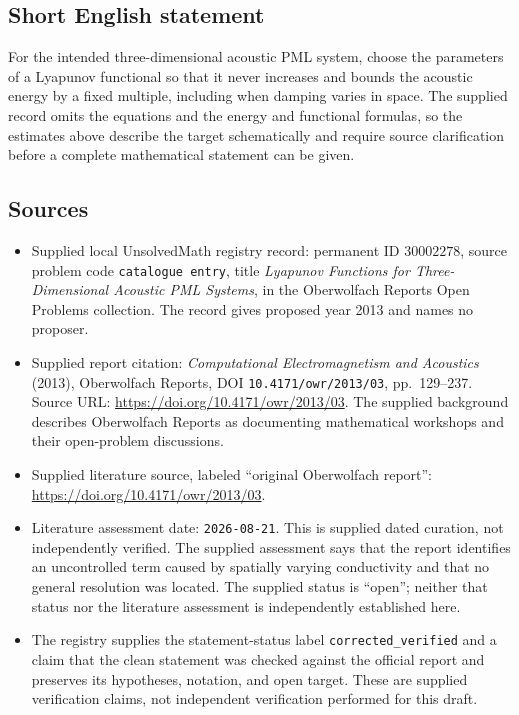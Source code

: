 \documentclass[11pt]{article}
\begin{document}
\subsection{Short English statement}
For the intended three-dimensional acoustic PML system, choose the parameters of a Lyapunov functional so that it never increases and bounds the acoustic energy by a fixed multiple, including when damping varies in space. The supplied record omits the equations and the energy and functional formulas, so the estimates above describe the target schematically and require source clarification before a complete mathematical statement can be given.
\subsection{Sources}
\begin{itemize}
\item Supplied local UnsolvedMath registry record: permanent ID \(30002278\), source problem code \texttt{catalogue entry}, title \emph{Lyapunov Functions for Three-Dimensional Acoustic PML Systems}, in the Oberwolfach Reports Open Problems collection. The record gives proposed year 2013 and names no proposer.
\item Supplied report citation: \emph{Computational Electromagnetism and Acoustics} (2013), Oberwolfach Reports, DOI \texttt{10.4171/owr/2013/03}, pp.\ 129--237. Source URL: \url{https://doi.org/10.4171/owr/2013/03}. The supplied background describes Oberwolfach Reports as documenting mathematical workshops and their open-problem discussions.
\item Supplied literature source, labeled ``original Oberwolfach report'': \url{https://doi.org/10.4171/owr/2013/03}.
\item Literature assessment date: \texttt{2026-08-21}. This is supplied dated curation, not independently verified. The supplied assessment says that the report identifies an uncontrolled term caused by spatially varying conductivity and that no general resolution was located. The supplied status is ``open''; neither that status nor the literature assessment is independently established here.
\item The registry supplies the statement-status label \texttt{corrected\_verified} and a claim that the clean statement was checked against the official report and preserves its hypotheses, notation, and open target. These are supplied verification claims, not independent verification performed for this draft.
\end{itemize}
\end{document}
